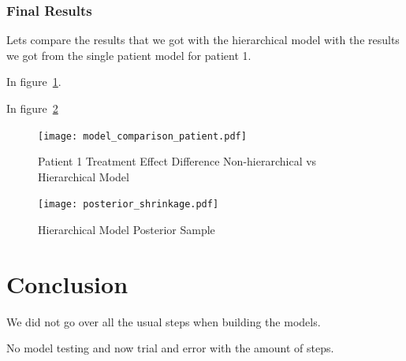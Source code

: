 \documentclass[12pt,a4paper,leqno]{report}
\theoremstyle{plain}
\theoremstyle{definition}
\theoremstyle{remark}
\begin{document}
\subsection{Final Results}

Lets compare the results that we got with the hierarchical model with the results we got
from the single patient model for patient 1.

In figure\ \ref{modelcomparisonpatient}.

In figure\ \ref{posteriorshrinkage}


\bigskip
\begin{figure}[H]
    \caption{Patient 1 Treatment Effect Difference Non-hierarchical vs Hierarchical Model}
    \label{modelcomparisonpatient}
    \bigskip
    \texttt{[image: model\_comparison\_patient.pdf]}
\end{figure}
\bigskip

\bigskip
\begin{figure}[H]
    \caption{Hierarchical Model Posterior Sample}
    \label{posteriorshrinkage}
    \bigskip
    \texttt{[image: posterior\_shrinkage.pdf]}
\end{figure}
\bigskip

\chapter{Conclusion}

We did not go over all the usual steps when building the models.

No model testing and now trial and error with the amount of steps.

\end{document}
